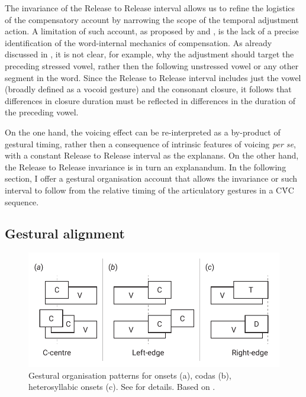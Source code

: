 \documentclass[preprint]{JASAnew}
\begin{document}
The invariance of the Release to Release interval allows us to refine
the logistics of the compensatory account by narrowing the scope of the
temporal adjustment action. A limitation of such account, as proposed by
\citet{slis1969} and \citet{lehiste1970}, is the lack of a precise
identification of the word-internal mechanics of compensation. As
already discussed in , it is not clear, for example, why
the adjustment should target the preceding stressed vowel, rather then
the following unstressed vowel or any other segment in the word. Since
the Release to Release interval includes just the vowel (broadly defined
as a vocoid gesture) and the consonant closure, it follows that
differences in closure duration must be reflected in differences in the
duration of the preceding vowel.

On the one hand, the voicing effect can be re-interpreted as a
by-product of gestural timing, rather then a consequence of intrinsic
features of voicing \emph{per se}, with a constant Release to Release
interval as the explanans. On the other hand, the Release to Release
invariance is in turn an explanandum. In the following section, I offer
a gestural organisation account that allows the invariance or such
interval to follow from the relative timing of the articulatory gestures
in a CV́C sequence.

\hypertarget{gestural-alignment}{%
\subsection{Gestural alignment}\label{gestural-alignment}}

\label{s:gestural}

\begin{figure}
  \centering
  \includegraphics{img/gorganisation.pdf}
  \caption{Gestural organisation patterns for onsets (a), codas (b), heterosyllabic onsets (c). See  for details. Based on \citet{marin2010}.}
  \label{f:gorganisation}
\end{figure}
\end{document}
